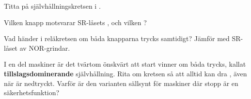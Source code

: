 \label{c6:ex:12}
Titta på självhållningskretsen i .
\begin{parts}
  \item Vilken knapp motsvarar SR-låsets , och vilken ?
  \item Vad händer i reläkretsen om båda knapparna trycks samtidigt? Jämför med SR-låset av
    NOR-grindar.
  \item I en del maskiner är det tvärtom önskvärt att start vinner om båda trycks, kallat
    \textbf{tillslagsdominerande} självhållning. Rita om kretsen så att  alltid kan dra
    , även när  är nedtryckt. Varför är den varianten sällsynt för maskiner där
    stopp är en säkerhetsfunktion?
\end{parts}
